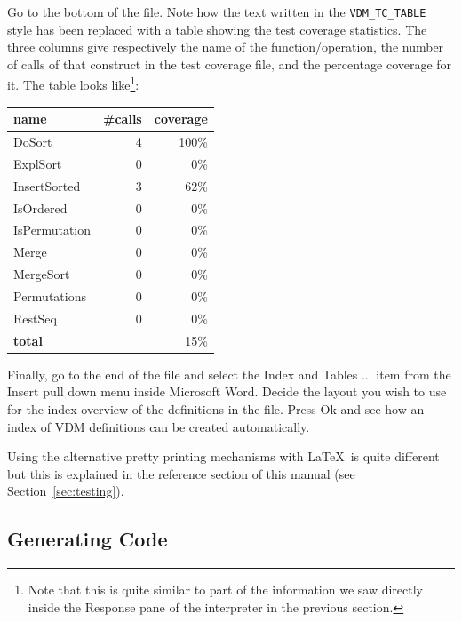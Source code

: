 \documentclass[\pformat,12pt]{article}
\newcommand{\guicmd}[1]{{\sf #1}}
\begin{document}
Go to the bottom of the  file. Note how the
text written in the {\tt VDM\_TC\_TABLE} style has been replaced with a
table showing the test coverage statistics. The three columns give
respectively the name of the function/operation, the number of calls
of that construct in 
the test coverage file, and the percentage coverage for it. The table
looks like\footnote{Note that this is quite similar to part of the
information we saw directly inside the \guicmd{Response} pane of
the interpreter in the previous section.}:


\begin{center}
\begin{tabular}{|l|r|r|}\hline
\textbf{name}   & \textbf{\#calls} & \textbf{coverage} \\ \hline
DoSort          & 4     & 100\% \\
ExplSort        & 0     & 0\%\\
InsertSorted    & 3     & 62\%\\
IsOrdered       & 0     & 0\%\\
IsPermutation   & 0     & 0\%\\
Merge           & 0     & 0\%\\
MergeSort       & 0     & 0\%\\
Permutations    & 0     & 0\%\\
RestSeq         & 0     & 0\%\\
\textbf{total}  &       & 15\%\\\hline
\end{tabular} 
\end{center}

Finally, go to the end of the file and select the \guicmd{Index
and Tables ...} item from the \guicmd{Insert} pull down menu inside
Microsoft Word. Decide the layout you wish to use for the index
overview of the definitions in the  file. Press \guicmd{Ok} and see how
an index of VDM definitions can be created automatically.

Using the alternative pretty printing mechanisms with \LaTeX\ is quite
different but this is explained in the reference section of this
manual (see Section~\ref{sec:testing}).


\subsection{Generating Code}
\end{document}
